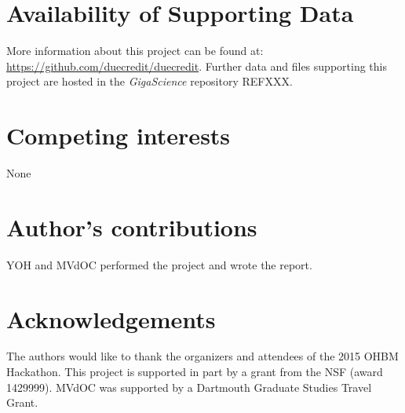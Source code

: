 \documentclass[twocolumn]{bmcart}%
\begin{document}
\begin{backmatter}

\section*{Availability of Supporting Data}
More information about this project can be found at: \url{https://github.com/duecredit/duecredit}. Further data and files supporting this project are hosted in the \emph{GigaScience} repository REFXXX.

\section*{Competing interests}
None

\section*{Author's contributions}
YOH and MVdOC performed the project and wrote the report.

\section*{Acknowledgements}
The authors would like to thank the organizers and attendees of the 2015
OHBM Hackathon. This project is supported in part by a grant from the
NSF (award 1429999). MVdOC was supported by a Dartmouth Graduate Studies
Travel Grant.

  
  


\end{backmatter}
\end{document}
